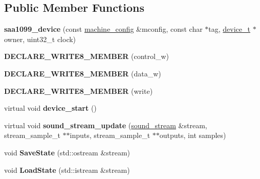 \subsection*{Public Member Functions}
\begin{DoxyCompactItemize}
\item 
\hypertarget{classsaa1099__device_a3fdd05697cef7dc0c55be1b728122f73}{{\bfseries saa1099\-\_\-device} (const \hyperlink{structmachine__config}{machine\-\_\-config} \&mconfig, const char $\ast$tag, \hyperlink{classdevice__t}{device\-\_\-t} $\ast$owner, uint32\-\_\-t clock)}\label{classsaa1099__device_a3fdd05697cef7dc0c55be1b728122f73}

\item 
\hypertarget{classsaa1099__device_aaf9c2cd63f3d241eade87b89a3b0ac93}{{\bfseries D\-E\-C\-L\-A\-R\-E\-\_\-\-W\-R\-I\-T\-E8\-\_\-\-M\-E\-M\-B\-E\-R} (control\-\_\-w)}\label{classsaa1099__device_aaf9c2cd63f3d241eade87b89a3b0ac93}

\item 
\hypertarget{classsaa1099__device_ac335014d54e7dfacbc72eadaadc6d4a9}{{\bfseries D\-E\-C\-L\-A\-R\-E\-\_\-\-W\-R\-I\-T\-E8\-\_\-\-M\-E\-M\-B\-E\-R} (data\-\_\-w)}\label{classsaa1099__device_ac335014d54e7dfacbc72eadaadc6d4a9}

\item 
\hypertarget{classsaa1099__device_a6d0ea25b9c3c12c422ce74987db0e385}{{\bfseries D\-E\-C\-L\-A\-R\-E\-\_\-\-W\-R\-I\-T\-E8\-\_\-\-M\-E\-M\-B\-E\-R} (write)}\label{classsaa1099__device_a6d0ea25b9c3c12c422ce74987db0e385}

\item 
\hypertarget{classsaa1099__device_af447e52803dbde64ff660759ad8ea839}{virtual void {\bfseries device\-\_\-start} ()}\label{classsaa1099__device_af447e52803dbde64ff660759ad8ea839}

\item 
\hypertarget{classsaa1099__device_a79e82e83fa9574f62daaf081d5a28959}{virtual void {\bfseries sound\-\_\-stream\-\_\-update} (\hyperlink{structdevice__sound__interface_1_1sound__stream}{sound\-\_\-stream} \&stream, stream\-\_\-sample\-\_\-t $\ast$$\ast$inputs, stream\-\_\-sample\-\_\-t $\ast$$\ast$outputs, int samples)}\label{classsaa1099__device_a79e82e83fa9574f62daaf081d5a28959}

\item 
\hypertarget{classsaa1099__device_a93d709132872b5ecd71603d07419e140}{void {\bfseries Save\-State} (std\-::ostream \&stream)}\label{classsaa1099__device_a93d709132872b5ecd71603d07419e140}

\item 
\hypertarget{classsaa1099__device_a850ce40090d5cedad0526af74e3e41d4}{void {\bfseries Load\-State} (std\-::istream \&stream)}\label{classsaa1099__device_a850ce40090d5cedad0526af74e3e41d4}

\end{DoxyCompactItemize}


